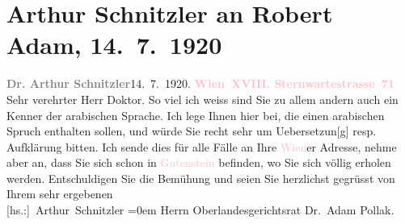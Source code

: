 

               \section[Arthur Schnitzler an Robert Adam, 14. 7. 1920]{ Arthur Schnitzler an Robert Adam, 14. 7. 1920}\nopagebreak{}\rehead{ }\normalsize\beginnumbering{} \toendnotes[C]{\smallbreak\pagebreak[2]} 
\toendnotes[C]{\smallbreak}\pstart
           \noindent{}{\pb}\textcolor{gray}{\textbf{Dr. Arthur Schnitzler}}\hfill 14. 7. 1920.\pend
           \pstart
           \textcolor{gray}{\textbf{\textcolor{pink}{Wien XVIII. Sternwartestrasse 71}{}\ledrightnote{\textcolor{pink}{Sternwartestraße}}}}\pend
           \pstart{}Sehr verehrter Herr Doktor.\pend\pstart
           So viel ich weiss sind Sie zu allem andern auch ein Kenner der arabischen
                    Sprache. Ich lege Ihnen hier \label{K_L02349_1v}\label{K_L02349_1h} bei, die einen arabischen Spruch enthalten sollen, und
                    würde Sie recht sehr um Uebersetzun{[}g{]} resp. Aufklärung
                    bitten. Ich sende dies für alle Fälle an Ihre \textcolor{pink}{Wien}{}\ledrightnote{\textcolor{pink}{Wien}}er Adresse, nehme aber an, dass Sie sich schon in \textcolor{pink}{Gutenstein}{}\ledrightnote{\textcolor{pink}{Gutenstein}} befinden, wo Sie sich völlig erholen
                    werden.\pend
           \pstart
           Entschuldigen Sie die Bemühung und seien Sie herzlichst gegrüsst
                    von{\\[\baselineskip]}Ihrem sehr ergebenen{\\[\baselineskip]}\spacefill\mbox{{[}hs.:{]} Arthur Schnitzler}\pend
           \leftskip=0em{}\pstart
           \noindent{}Herrn Oberlandesgerichtsrat Dr. Adam Pollak.\pend
           \endnumbering{}  
      